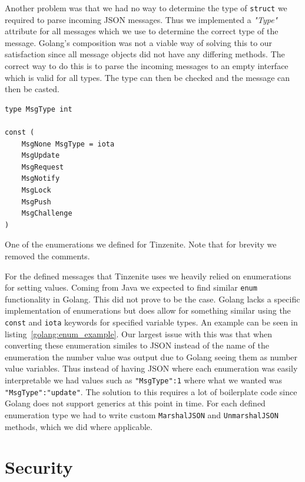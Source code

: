 Another problem was that we had no way to determine the type of \texttt{struct} we required to parse incoming JSON messages.
Thus we implemented a \textit{"Type"} attribute for all messages which we use to determine the correct type of the message.
Golang's composition was not a viable way of solving this to our satisfaction since all message objects did not have any differing methods.
The correct way to do this is to parse the incoming messages to an empty interface which is valid for all types.
The type can then be checked and the message can then be casted.

\begin{listing}[htp]
    \begin{lstlisting}[language=golang,firstnumber=0]
type MsgType int

const (
	MsgNone MsgType = iota
	MsgUpdate
	MsgRequest
	MsgNotify
	MsgLock
	MsgPush
	MsgChallenge
)
    \end{lstlisting}
\caption[Golang Enum Example]{One of the enumerations we defined for Tinzenite. Note that for brevity we removed the comments.}
\label{golang:enum_example}
\end{listing}

For the defined messages that Tinzenite uses we heavily relied on enumerations for setting values.
Coming from Java we expected to find similar \texttt{enum} functionality in Golang.
This did not prove to be the case.
Golang lacks a specific implementation of enumerations but does allow for something similar using the \texttt{const} and \texttt{iota} keywords for specified variable types.
An example can be seen in listing~\ref{golang:enum_example}.
Our largest issue with this was that when converting these enumeration similes to JSON instead of the name of the enumeration the number value was output due to Golang seeing them as number value variables.
Thus instead of having JSON where each enumeration was easily interpretable we had values such as \texttt{"MsgType":1} where what we wanted was \texttt{"MsgType":"update"}.
The solution to this requires a lot of boilerplate code since Golang does not support generics at this point in time.
For each defined enumeration type we had to write custom \texttt{MarshalJSON} and \texttt{UnmarshalJSON} methods, which we did where applicable.

\section{Security}
\label{sec:Security}

